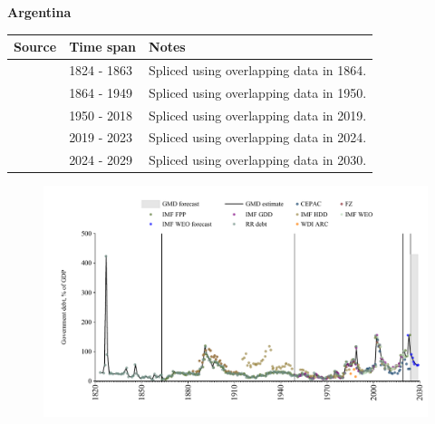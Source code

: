 \documentclass[12pt,a4paper,landscape]{article}
\begin{document}
\begin{adjustbox}{max totalsize={\paperwidth}{\paperheight},center}
\begin{minipage}[t][\textheight][t]{\textwidth}
\vspace*{0.5cm}
{}
\begin{center}
{\Large\bfseries Argentina}
\end{center}
\vspace{0.5cm}
\begin{table}[H]
\centering
\small
\begin{tabular}{|l|l|l|}
\hline
\textbf{Source} & \textbf{Time span} & \textbf{Notes} \\
\hline
\rowcolor{white}\cite{RR_debt}& 1824 - 1863 &Spliced using overlapping data in 1864.\\
\rowcolor{lightgray}\cite{IMF_FPP}& 1864 - 1949 &Spliced using overlapping data in 1950.\\
\rowcolor{white}\cite{IMF_GDD}& 1950 - 2018 &Spliced using overlapping data in 2019.\\
\rowcolor{lightgray}\cite{IMF_FPP}& 2019 - 2023 &Spliced using overlapping data in 2024.\\
\rowcolor{white}\cite{IMF_WEO_forecast}& 2024 - 2029 &Spliced using overlapping data in 2030.\\
\hline
\end{tabular}
\end{table}
\begin{figure}[H]
\centering
\includegraphics[width=\textwidth,height=0.6\textheight,keepaspectratio]{graphs/ARG_govdebt_GDP.pdf}
\end{figure}
\end{minipage}
\end{adjustbox}
\end{document}
